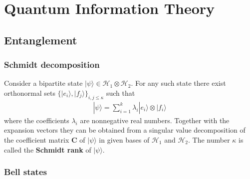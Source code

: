 \chapter{Quantum Information Theory}\label{chapter:quantum_computing}

\section{Entanglement}
\subsection{Schmidt decomposition}

    \begin{construct}
        Consider a bipartite state $|\psi\rangle\in\mathcal{H}_1\otimes\mathcal{H}_2$. For any such state there exist orthonormal sets $\big\{|e_i\rangle, |f_j\rangle\big\}_{i,j\leq\kappa}$ such that
        \begin{gather}
            |\psi\rangle = \sum_{i=1}^k\lambda_i|e_i\rangle\otimes|f_i\rangle
        \end{gather}
        where the coefficients $\lambda_i$ are nonnegative real numbers. Together with the expansion vectors they can be obtained from a singular value decomposition of the coefficient matrix $\mathbf{C}$ of $|\psi\rangle$ in given bases of $\mathcal{H}_1$ and $\mathcal{H}_2$. The number $\kappa$ is called the \textbf{Schmidt rank} of $|\psi\rangle$.
    \end{construct}


\subsection{Bell states}

